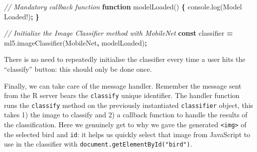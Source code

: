 \documentclass[
  10pt,
]{krantz}
\makeatletter
\newenvironment{Shaded}{\begin{snugshade}}{\end{snugshade}}
\newcommand{\AttributeTok}[1]{\textcolor[rgb]{0.61,0.61,0.61}{#1}}
\newcommand{\CommentTok}[1]{\textcolor[rgb]{0.37,0.37,0.37}{\textit{#1}}}
\newcommand{\KeywordTok}[1]{\textcolor[rgb]{0.27,0.27,0.27}{\textbf{#1}}}
\newcommand{\NormalTok}[1]{#1}
\newcommand{\OperatorTok}[1]{\textcolor[rgb]{0.43,0.43,0.43}{\textbf{#1}}}
\newcommand{\StringTok}[1]{\textcolor[rgb]{0.5,0.5,0.5}{#1}}
\newcommand{\VariableTok}[1]{\textcolor[rgb]{0,0,0}{#1}}
\newenvironment{kframe}{%
\medskip{}
\setlength{\fboxsep}{.8em}
 \def\at@end@of@kframe{}%
 \ifinner\ifhmode%
  \def\at@end@of@kframe{\end{minipage}}%
  \begin{minipage}{\columnwidth}%
 \fi\fi%
 \def\FrameCommand##1{\hskip\@totalleftmargin \hskip-\fboxsep
 \colorbox{shadecolor}{##1}\hskip-\fboxsep
     \hskip-\linewidth \hskip-\@totalleftmargin \hskip\columnwidth}%
 \MakeFramed {\advance\hsize-\width
   \@totalleftmargin\z@ \linewidth\hsize
   \@setminipage}}%
 {\par\unskip\endMakeFramed%
 \at@end@of@kframe}
\renewenvironment{Shaded}{\begin{kframe}}{\end{kframe}}
\newenvironment{rmdblock}[1]
  {
  \begin{itemize}
  \renewcommand{\labelitemi}{
    \raisebox{-.7\height}[0pt][0pt]{
      {\setkeys{Gin}{width=3em,keepaspectratio}\texttt{[image: images/\#1]}}
    }
  }
  \setlength{\fboxsep}{1em}
  \begin{kframe}
  \item
  }
  {
  \end{kframe}
  \end{itemize}
  }
\newenvironment{rmdnote}
  {\begin{rmdblock}{note}}
  {\end{rmdblock}}
\makeatother
\begin{document}
\begin{Shaded}
\begin{Highlighting}[]
\CommentTok{// Mandatory callback function}
\KeywordTok{function} \AttributeTok{modelLoaded}\NormalTok{() }\OperatorTok{\{}
  \VariableTok{console}\NormalTok{.}\AttributeTok{log}\NormalTok{(}\StringTok{\textquotesingle{}Model Loaded!\textquotesingle{}}\NormalTok{)}\OperatorTok{;}
\OperatorTok{\}}

\CommentTok{// Initialize the Image Classifier method with MobileNet}
\KeywordTok{const}\NormalTok{ classifier }\OperatorTok{=} \VariableTok{ml5}\NormalTok{.}\AttributeTok{imageClassifier}\NormalTok{(}\StringTok{\textquotesingle{}MobileNet\textquotesingle{}}\OperatorTok{,}\NormalTok{ modelLoaded)}\OperatorTok{;}
\end{Highlighting}
\end{Shaded}

\begin{rmdnote}
There is no need to repeatedly initialise the classifier every time a
user hits the ``classify'' button: this should only be done once.
\end{rmdnote}

Finally, we can take care of the message handler. Remember the message sent from the R server bears the \texttt{classify} unique identifier. The handler function runs the \texttt{classify} method on the previously instantiated \texttt{classifier} object, this takes 1) the image to classify and 2) a callback function to handle the results of the classification. Here we genuinely get to why we gave the generated \texttt{\textless{}img\textgreater{}} of the selected bird and \texttt{id}: it helps us quickly select that image from JavaScript to use in the classifier with \texttt{document.getElementById("bird")}.
\end{document}
